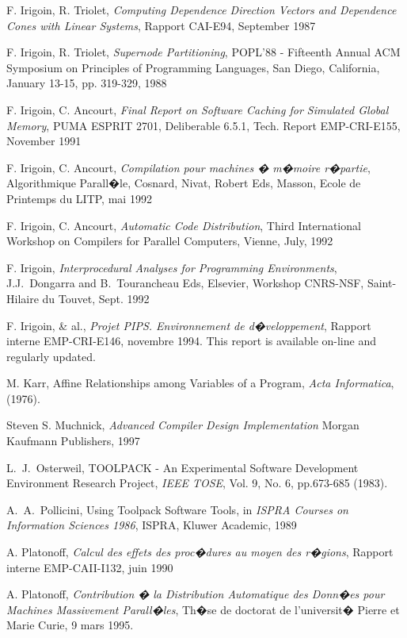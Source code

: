 \documentclass[a4paper]{report}
\begin{document}
\begin{thebibliography}{99}
   F. Irigoin, R. Triolet,
{\em Computing Dependence Direction Vectors and Dependence Cones with
Linear Systems}, Rapport CAI-E94, September 1987

   F. Irigoin, R. Triolet,
{\em Supernode Partitioning},
POPL'88 - Fifteenth Annual ACM
Symposium on Principles of Programming Languages, San Diego, California,
January 13-15, pp. 319-329, 1988

   F. Irigoin, C. Ancourt,
{\em Final Report on Software Caching for Simulated Global Memory},
PUMA ESPRIT 2701, Deliberable 6.5.1, Tech. Report EMP-CRI-E155, November 1991

   F. Irigoin, C. Ancourt,
{\em Compilation pour machines � m�moire r�partie},
Algorithmique Parall�le, Cosnard, Nivat, Robert Eds, Masson,
Ecole de Printemps du LITP, mai 1992

   F. Irigoin, C. Ancourt,
{\em Automatic Code Distribution},
Third International Workshop on Compilers for Parallel Computers, Vienne,
July, 1992

   F. Irigoin,
{\em Interprocedural Analyses for Programming Environments},
J.J.~Dongarra and B.~Tourancheau Eds, Elsevier,
Workshop CNRS-NSF, Saint-Hilaire du Touvet, Sept. 1992

   F. Irigoin, \& al.,
{\em Projet PIPS. Environnement de d�veloppement},
Rapport interne EMP-CRI-E146, novembre 1994. This report is available
on-line and regularly updated.

 M. Karr, Affine Relationships among Variables of a Program,
{\em Acta Informatica}, (1976).

 Steven S. Muchnick,
  {\it Advanced Compiler Design Implementation}
  Morgan Kaufmann Publishers, 1997
 
 L.~J.~Osterweil, TOOLPACK - An Experimental Software
    Development Environment Research Project,
{\em IEEE TOSE}, Vol. 9, No. 6, pp.673-685 (1983).

 A.~A.~Pollicini, Using Toolpack Software Tools, in {\em
  ISPRA Courses on Information Sciences 1986}, ISPRA, Kluwer Academic,
  1989

 A. Platonoff, {\em Calcul des effets des proc�dures au
  moyen des r�gions}, Rapport interne EMP-CAII-I132, juin 1990

 A. Platonoff, {\em Contribution � la Distribution
  Automatique des Donn�es pour Machines Massivement Parall�les},
  Th�se de doctorat de l'universit� Pierre et Marie Curie, 9 mars
  1995.


\end{thebibliography}
\end{document}
